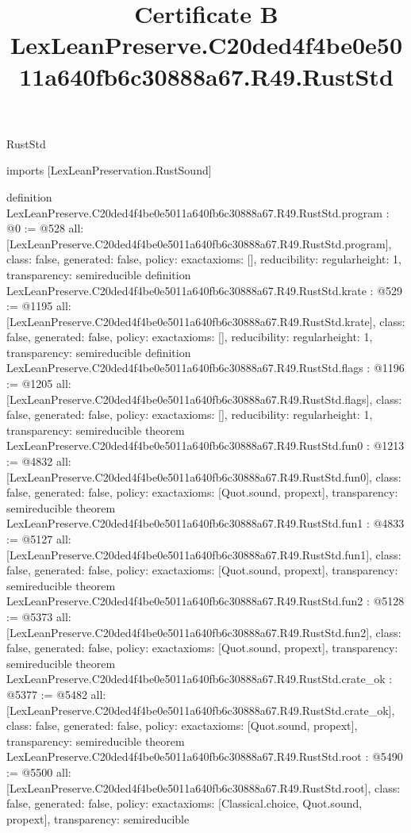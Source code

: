 \begin{lexlean}{RustStd}
\title{Certificate B LexLeanPreserve.C20ded4f4be0e5011a640fb6c30888a67.R49.RustStd}
\begin{coremodule}
imports [LexLeanPreservation.RustSound]

definition LexLeanPreserve.C20ded4f4be0e5011a640fb6c30888a67.R49.RustStd.program : @0 := @528 {
  all: [LexLeanPreserve.C20ded4f4be0e5011a640fb6c30888a67.R49.RustStd.program],
  class: false,
  generated: false,
  policy: exact{axioms: []},
  reducibility: regular{height: 1},
  transparency: semireducible
}
definition LexLeanPreserve.C20ded4f4be0e5011a640fb6c30888a67.R49.RustStd.krate : @529 := @1195 {
  all: [LexLeanPreserve.C20ded4f4be0e5011a640fb6c30888a67.R49.RustStd.krate],
  class: false,
  generated: false,
  policy: exact{axioms: []},
  reducibility: regular{height: 1},
  transparency: semireducible
}
definition LexLeanPreserve.C20ded4f4be0e5011a640fb6c30888a67.R49.RustStd.flags : @1196 := @1205 {
  all: [LexLeanPreserve.C20ded4f4be0e5011a640fb6c30888a67.R49.RustStd.flags],
  class: false,
  generated: false,
  policy: exact{axioms: []},
  reducibility: regular{height: 1},
  transparency: semireducible
}
theorem LexLeanPreserve.C20ded4f4be0e5011a640fb6c30888a67.R49.RustStd.fun0 : @1213 := @4832 {
  all: [LexLeanPreserve.C20ded4f4be0e5011a640fb6c30888a67.R49.RustStd.fun0],
  class: false,
  generated: false,
  policy: exact{axioms: [Quot.sound, propext]},
  transparency: semireducible
}
theorem LexLeanPreserve.C20ded4f4be0e5011a640fb6c30888a67.R49.RustStd.fun1 : @4833 := @5127 {
  all: [LexLeanPreserve.C20ded4f4be0e5011a640fb6c30888a67.R49.RustStd.fun1],
  class: false,
  generated: false,
  policy: exact{axioms: [Quot.sound, propext]},
  transparency: semireducible
}
theorem LexLeanPreserve.C20ded4f4be0e5011a640fb6c30888a67.R49.RustStd.fun2 : @5128 := @5373 {
  all: [LexLeanPreserve.C20ded4f4be0e5011a640fb6c30888a67.R49.RustStd.fun2],
  class: false,
  generated: false,
  policy: exact{axioms: [Quot.sound, propext]},
  transparency: semireducible
}
theorem LexLeanPreserve.C20ded4f4be0e5011a640fb6c30888a67.R49.RustStd.crate_ok : @5377 := @5482 {
  all: [LexLeanPreserve.C20ded4f4be0e5011a640fb6c30888a67.R49.RustStd.crate_ok],
  class: false,
  generated: false,
  policy: exact{axioms: [Quot.sound, propext]},
  transparency: semireducible
}
theorem LexLeanPreserve.C20ded4f4be0e5011a640fb6c30888a67.R49.RustStd.root : @5490 := @5500 {
  all: [LexLeanPreserve.C20ded4f4be0e5011a640fb6c30888a67.R49.RustStd.root],
  class: false,
  generated: false,
  policy: exact{axioms: [Classical.choice, Quot.sound, propext]},
  transparency: semireducible
}


\end{coremodule}
\end{lexlean}
